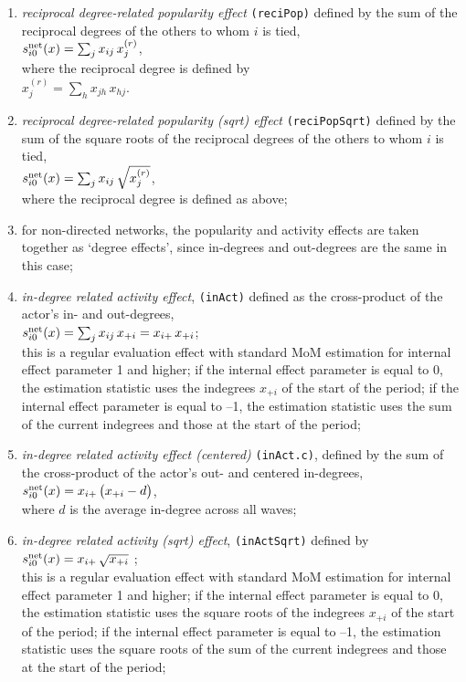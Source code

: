 \documentclass[a4paper,fleqn,11pt]{article}
\newcommand{\+}{\, + \,}
\newcommand{\vit}{\theenumi}
\begin{document}
\begin{enumerate}
 \item {\em reciprocal degree-related popularity effect} \texttt{(reciPop)}
 defined by the sum of the reciprocal degrees
 of the others to whom $i$ is tied,\\
 $s^{\rm net}_{i\vit}(x) =  \sum_j x_{ij}\, x^{(r)}_{j} $, \\
 where the reciprocal degree is defined by\\
 $ x^{(r)}_{j} = \sum_h x_{jh}\, x_{hj} $.

 \item {\em reciprocal degree-related popularity (sqrt) effect } \texttt{(reciPopSqrt)}
 defined by the sum of the square roots of the reciprocal degrees
 of the others to whom $i$ is tied,\\
 $s^{\rm net}_{i\vit}(x) =  \sum_j x_{ij}\, \sqrt{x^{(r)}_{j}} $, \\
 where the reciprocal degree is defined as above;

 \item[{\hspace*{-1ex}$\bigodot$}] for non-directed networks, the popularity and activity
 effects are taken together as `degree effects',
 since in-degrees and out-degrees are the same in this case;

 \item {\em in-degree related activity effect}, \texttt{(inAct)}
 defined as  the cross-product  of the actor's in- and out-degrees,\\
 $s^{\rm net}_{i\vit}(x) =  \sum_j x_{ij}\, x_{+i}  = x_{i+}\, x_{+i}$;\\
 this is a regular evaluation effect with standard MoM estimation
 for internal effect parameter 1 and higher;
  if the internal effect parameter is equal to 0, the estimation statistic uses
  the indegrees $x_{+i} $ of the start of the period;
  if the internal effect parameter is equal to --1, the estimation statistic uses
  the sum of the current indegrees and those at the start of the period;

 \item {\em in-degree related activity effect (centered)} \texttt{(inAct.c)},
 defined by the sum of
 the cross-product of the actor's out- and centered in-degrees,\\
 $s^{\rm net}_{i\vit}(x) =  x_{i+}\,\big( x_{+i} - d \big)$,\\
 where $d$ is the average in-degree across all waves;

 \item {\em in-degree related activity (sqrt) effect}, \texttt{(inActSqrt)}
 defined by  \\
 $s^{\rm net}_{i\vit}(x) = x_{i+}\,\sqrt{x_{+i}}$ ;\\
 this is a regular evaluation effect with standard MoM estimation
 for internal effect parameter 1 and higher;
  if the internal effect parameter is equal to 0, the estimation statistic uses
  the square roots of the indegrees $x_{+i} $ of the start of the period;
  if the internal effect parameter is equal to --1, the estimation statistic uses
  the square roots of the sum of the current indegrees and those at the start of the period;


\end{enumerate}
\end{document}
